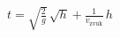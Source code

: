 \documentclass[preview]{standalone}
\begin{document}
\begin{align*}
t = \sqrt{\frac{2}{g}} \, \sqrt{h} + \frac{1}{v_{\text{zvuk}}} \, h
\end{align*}
\end{document}
